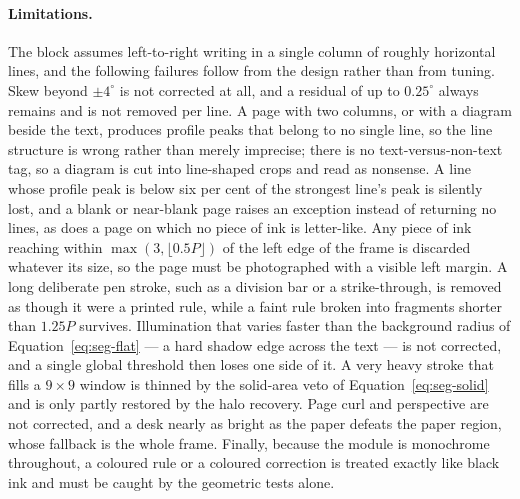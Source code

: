 \paragraph{Limitations.}
The block assumes left-to-right writing in a single column of roughly horizontal lines, and the following failures follow from the design rather than from tuning.
Skew beyond $\pm4^\circ$ is not corrected at all, and a residual of up to $0.25^\circ$ always remains and is not removed per line.
A page with two columns, or with a diagram beside the text, produces profile peaks that belong to no single line, so the line structure is wrong rather than merely imprecise; there is no text-versus-non-text tag, so a diagram is cut into line-shaped crops and read as nonsense.
A line whose profile peak is below six per cent of the strongest line's peak is silently lost, and a blank or near-blank page raises an exception instead of returning no lines, as does a page on which no piece of ink is letter-like.
Any piece of ink reaching within $\max(3,\lfloor0.5P\rfloor)$ of the left edge of the frame is discarded whatever its size, so the page must be photographed with a visible left margin.
A long deliberate pen stroke, such as a division bar or a strike-through, is removed as though it were a printed rule, while a faint rule broken into fragments shorter than $1.25P$ survives.
Illumination that varies faster than the background radius of Equation~\ref{eq:seg-flat} --- a hard shadow edge across the text --- is not corrected, and a single global threshold then loses one side of it.
A very heavy stroke that fills a $9\times9$ window is thinned by the solid-area veto of Equation~\ref{eq:seg-solid} and is only partly restored by the halo recovery.
Page curl and perspective are not corrected, and a desk nearly as bright as the paper defeats the paper region, whose fallback is the whole frame.
Finally, because the module is monochrome throughout, a coloured rule or a coloured correction is treated exactly like black ink and must be caught by the geometric tests alone.
